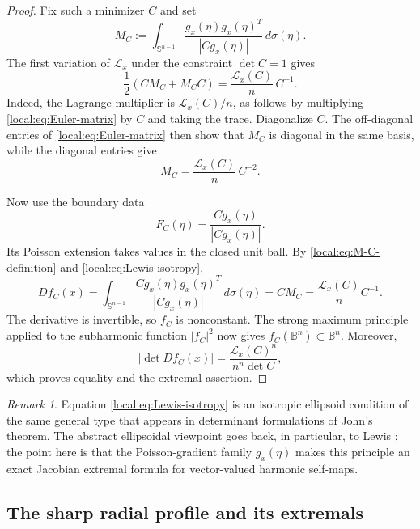 \documentclass[11pt,reqno]{amsart}
\theoremstyle{remark}
\newtheorem{remark}[theorem]{Remark}
\newcommand{\B}{\mathbb B}
\newcommand{\Sph}{\mathbb S}
\begin{document}
\begin{proof}
Fix such a minimizer $C$ and set
\begin{equation}\label{local:eq:M-C-definition}
 M_C
 :=
 \int_{\Sph^{n-1}}
 \frac{g_x(\eta)g_x(\eta)^T}{|Cg_x(\eta)|}\,d\sigma(\eta).
\end{equation}
The first variation of $\mathcal L_x$ under the constraint $\det C=1$ gives
\begin{equation}\label{local:eq:Euler-matrix}
 \frac12(CM_C+M_CC)
 =
 \frac{\mathcal L_x(C)}{n}\,C^{-1}.
\end{equation}
Indeed, the Lagrange multiplier is $\mathcal L_x(C)/n$, as follows by
multiplying \eqref{local:eq:Euler-matrix} by $C$ and taking the trace.  Diagonalize
$C$.  The off-diagonal entries of \eqref{local:eq:Euler-matrix} then show that
$M_C$ is diagonal in the same basis, while the diagonal entries give
\begin{equation}\label{local:eq:Lewis-isotropy}
 M_C
 =
 \frac{\mathcal L_x(C)}{n}\,C^{-2}.
\end{equation}

Now use the boundary data
\[
 F_C(\eta)
 =
 \frac{Cg_x(\eta)}{|Cg_x(\eta)|}.
\]
Its Poisson extension takes values in the closed unit ball.  By \eqref{local:eq:M-C-definition} and
\eqref{local:eq:Lewis-isotropy},
\[
 Df_C(x)
 =
 \int_{\Sph^{n-1}}
 \frac{Cg_x(\eta)g_x(\eta)^T}{|Cg_x(\eta)|}\,d\sigma(\eta)
 =
 CM_C
 =
 \frac{\mathcal L_x(C)}nC^{-1}.
\]
The derivative is invertible, so $f_C$ is nonconstant.  The strong maximum
principle applied to the subharmonic function $|f_C|^2$ now gives
$f_C(\B^n)\subset\B^n$.  Moreover,
\[
 |\det Df_C(x)|
 =
 \frac{\mathcal L_x(C)^n}{n^n\det C},
\]
which proves equality and the extremal assertion.
\end{proof}

\begin{remark}
Equation \eqref{local:eq:Lewis-isotropy} is an isotropic ellipsoid condition of the
same general type that appears in determinant formulations of John's theorem.
The abstract ellipsoidal viewpoint goes back, in particular, to Lewis
\cite{Lewis1979}; the point here is that the Poisson-gradient family
$g_x(\eta)$ makes this principle an exact Jacobian extremal formula for
vector-valued harmonic self-maps.
\end{remark}

\subsection{The sharp radial profile and its extremals}
\end{document}
